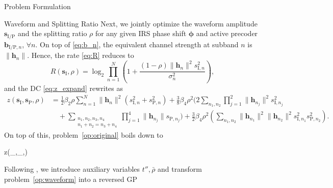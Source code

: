 \documentclass[journal,12pt,onecolumn,draftclsnofoot]{IEEEtran}
\begin{document}
\begin{section}{Problem Formulation}
		\begin{subsection}{Waveform and Splitting Ratio}
			Next, we jointly optimize the waveform amplitude $\boldsymbol{s}_{\mathrm{I/P}}$ and the splitting ratio $\rho$ for any given IRS phase shift $\boldsymbol{\phi}$ and active precoder $\boldsymbol{b}_{\mathrm{I/P},n}$, $\forall n$. On top of \eqref{eq:b_n}, the equivalent channel strength at subband $n$ is $\lVert{\boldsymbol{h}_n}\rVert$. Hence, the rate \eqref{eq:R} reduces to
			\begin{equation}\label{eq:R_waveform}
				R(\boldsymbol{s}_{\mathrm{I}},\rho) = \log_2\prod_{n=1}^N\left(1+\frac{(1-\rho)\lVert{\boldsymbol{h}_n}\rVert^2 s_{\mathrm{I},n}^2}{\sigma_n^2}\right),
			\end{equation}
			and the DC \eqref{eq:z_expand} rewrites as
			\begin{align}
				z(\boldsymbol{s}_{\mathrm{I}},\boldsymbol{s}_\mathrm{P},\rho)
				& = \frac{1}{2}{\beta_2}{\rho} \sum_{n=1}^N \lVert{\boldsymbol{h}_n}\rVert^2(s_{\mathrm{I},n}^2+s_{\mathrm{P},n}^2) + \frac{3}{8}{\beta_4}{\rho^2} \Biggl( 2\sum_{n_1,n_2} \prod_{j=1}^2 \lVert{\boldsymbol{h}_{n_j}}\rVert^2 s_{\mathrm{I},{n_j}}^2\nonumber\\
				& \quad + \sum_{\substack{{n_1},{n_2},{n_3},{n_4}\\{n_1}+{n_2}={n_3}+{n_4}}} \prod_{j=1}^4 \lVert{\boldsymbol{h}_{n_j}}\rVert s_{\mathrm{P},{n_j}} \Biggr) + \frac{3}{2}{\beta_4}{\rho^2} \left( \sum_{n_1,n_2} \lVert{\boldsymbol{h}_{n_1}}\rVert^2 \lVert{\boldsymbol{h}_{n_2}}\rVert^2 s_{\mathrm{I},{n_1}}^2 s_{\mathrm{P},{n_2}}^2 \right).\label{eq:z_waveform}
			\end{align}
			On top of this, problem~\eqref{op:original} boils down to
			\begin{maxi!}
				{}{z(_{},_,\rho)}{\label{op:waveform}}{}
			\end{maxi!}
			Following \cite{Clerckx2018b}, we introduce auxiliary variables $t'',\bar{\rho}$ and transform problem~\eqref{op:waveform} into a reversed GP
			\begin{mini!}
				{}{}{\label{op:waveform_rgp}}{}
				\label{co:waveform_objective}

\end{mini!}
\end{subsection}
\end{section}
\end{document}
